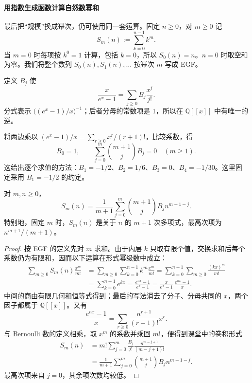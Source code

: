\documentclass[lang=cn,a4paper,fontset=none,zihao=false,10pt,openany,twoside]{beautybook}
\numberwithin{algorithm}{chapter}
\newcommand{\Q}{\mathbb Q}
\begin{document}
\paragraph{用指数生成函数计算自然数幂和}
最后把“规模”换成幂次，仍可使用同一套运算。固定 $n\ge0$，对 $m\ge0$ 记
\[
 S_m(n):=\sum_{k=0}^{n-1}k^m.
\]
当 $m=0$ 时每项按 $k^0=1$ 计算，包括 $k=0$，所以 $S_0(n)=n$。$n=0$ 时取空和为零。我们将整个数列 $S_0(n),S_1(n),\ldots$ 按幂次 $m$ 写成 EGF。
\begin{definition}[Bernoulli 数]\label{def:bernoulli-numbers}
定义 $B_j$ 使
\[
 \frac{x}{e^x-1}=\sum_{j\ge0}B_j\frac{x^j}{j!}.
\]
分式表示 $\bigl((e^x-1)/x\bigr)^{-1}$；后者分母的常数项是 $1$，所以在 $\Q[[x]]$ 中有唯一的逆。
\end{definition}
将两边乘以 $(e^x-1)/x=\sum_{r\ge0}x^r/(r+1)!$，比较系数，得
\[
 B_0=1,\qquad
 \sum_{j=0}^m\binom{m+1}jB_j=0\quad(m\ge1).
\]
这给出逐个求值的方法：$B_1=-1/2$、$B_2=1/6$、$B_3=0$、$B_4=-1/30$。这里固定采用 $B_1=-1/2$ 的约定。

\begin{theorem}\label{thm:bernoulli-power-sum}
对 $m,n\ge0$，
\[
 S_m(n)=\frac1{m+1}\sum_{j=0}^m
 \binom{m+1}jB_j n^{m+1-j}.
\]
特别地，固定 $m$ 时，$S_m(n)$ 是关于 $n$ 的 $m+1$ 次多项式，最高次项为 $n^{m+1}/(m+1)$。
\end{theorem}
\begin{proof}
按 EGF 的定义先对 $m$ 求和。由于内层 $k$ 只取有限个值，交换求和后每个系数仍为有限和，因而以下运算在形式幂级数中成立：
\[
 \begin{aligned}
 \sum_{m\ge0}S_m(n)\frac{x^m}{m!}
 &=\sum_{m\ge0}\sum_{k=0}^{n-1}k^m\frac{x^m}{m!}
 =\sum_{k=0}^{n-1}\sum_{m\ge0}\frac{(kx)^m}{m!}\\
 &=\sum_{k=0}^{n-1}e^{kx}
 =\frac{e^{nx}-1}{e^x-1}
 =\frac{x}{e^x-1}\,\frac{e^{nx}-1}{x}.
 \end{aligned}
\]
中间的商由有限几何和恒等式得到；最后的写法消去了分子、分母共同的 $x$，两个因子都属于 $\Q[[x]]$。又有
\[
 \frac{e^{nx}-1}{x}=\sum_{r\ge0}\frac{n^{r+1}}{(r+1)!}x^r.
\]
与 Bernoulli 数的定义相乘，取 $x^m$ 的系数并乘回 $m!$，便得到课堂中的卷积形式
\[
 \begin{aligned}
 S_m(n)
 &=m!\sum_{j=0}^m\frac{B_j}{j!}
          \frac{n^{m-j+1}}{(m-j+1)!}\\
 &=\frac1{m+1}\sum_{j=0}^m
          \binom{m+1}jB_j n^{m+1-j}.
 \end{aligned}
\]
最高次项来自 $j=0$，其余项次数均较低。
\end{proof}
\end{document}
